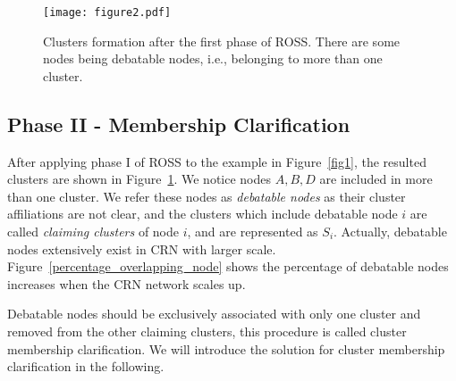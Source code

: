\documentclass[10pt,journal,compsoc]{IEEEtran}
\theoremstyle{mytheoremstyle}
\theoremstyle{mytheoremstyle}
\theoremstyle{mytheoremstyle}
\newcommand{\ie}{i.e., }
\begin{document}



\begin{figure}[ht!]
  \centering
  \texttt{[image: figure2.pdf]}
  \caption{Clusters formation after the first phase of ROSS. There are some nodes being debatable nodes, \ie belonging to more than one cluster.}
  \label{fig2}
\end{figure}


\subsection{Phase II - Membership Clarification}
After applying phase I of ROSS to the example in Figure~\ref{fig1}, the resulted clusters are shown in Figure~\ref{fig2}.
We notice nodes $A, B, D$ are included in more than one cluster. 
We refer these nodes as \textit{debatable nodes} as their cluster affiliations are not clear, and the clusters which include debatable node $i$ are called \textit{claiming clusters} of node $i$, and are represented as $S_i$.  
Actually, debatable nodes extensively exist in CRN with larger scale.
Figure~\ref{percentage_overlapping_node} shows the percentage of debatable nodes increases when the CRN network scales up.

Debatable nodes should be exclusively associated with only one cluster and removed from the other claiming clusters, this procedure is called cluster membership clarification.
We will introduce the solution for cluster membership clarification in the following.
\end{document}
